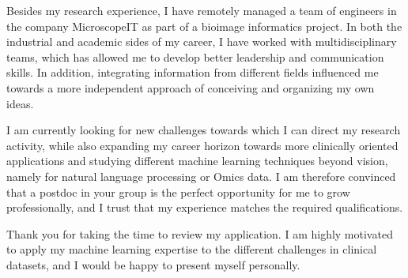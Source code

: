 \documentclass[10pt, letter]{ag-cv} %
\begin{document}
\begin{cvletter}
\begin{flushleft}
Besides my research experience, I have remotely managed a team of engineers in the company MicroscopeIT as part of a bioimage informatics project. In both the industrial and academic sides of my career, I have worked with multidisciplinary teams, which has allowed me to develop better leadership and communication skills. In addition, integrating information from different fields influenced me towards a more independent approach of conceiving and organizing my own ideas.

I am currently looking for new challenges towards which I can direct my research activity, while also expanding my career horizon towards more clinically oriented applications and studying different machine learning techniques beyond vision, namely for natural language processing or Omics data. I am therefore convinced that a postdoc in your group is the perfect opportunity for me to grow professionally, and I trust that my experience matches the required qualifications.

Thank you for taking the time to review my application. I am highly motivated to apply my machine learning expertise to the different challenges in clinical datasets, and I would be happy to present myself personally. 



\end{flushleft}

\end{cvletter}


\makeletterclosing %
\end{document}
